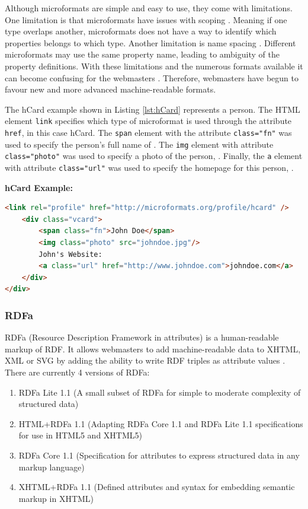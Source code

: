 Although microformats are simple and easy to use, they come with limitations. One limitation is that microformats have issues with scoping \cite{microformatsIssues}. Meaning if one type overlaps another, microformats does not have a way to identify which properties belongs to which type. Another limitation is name spacing \cite{microformatsIssues}. Different microformats may use the same property name, leading to ambiguity of the property definitions. With these limitations and the numerous formats available it can become confusing for the webmasters \cite{schemaOrg}. Therefore, webmasters have begun to favour new and more advanced machine-readable formats. 

The hCard example shown in Listing \ref{lst:hCard} represents a person. The HTML element \texttt{link} specifies which type of microformat is used through the attribute \texttt{href}, in this case hCard. The \texttt{span} element with the attribute \texttt{class="fn"} was used to specify the person's full name of . The \texttt{img} element with attribute \texttt{class="photo"} was used to specify a photo of the person, . Finally, the \texttt{a} element with attribute \texttt{class="url"} was used to specify the homepage for this person,  \cite{hcardMicroformat}.\newline

\noindent
\textbf{hCard Example:}
{
\begin{lstlisting}[language=HTML,caption={A hCard example},captionpos=b,label={lst:hCard}]
<link rel="profile" href="http://microformats.org/profile/hcard" />
    <div class="vcard">
        <span class="fn">John Doe</span>
        <img class="photo" src="johndoe.jpg"/>
        John's Website: 
        <a class="url" href="http://www.johndoe.com">johndoe.com</a>
    </div>
</div>
\end{lstlisting}
}

\subsubsection{RDFa}
RDFa (Resource Description Framework in attributes) is a human-readable markup of RDF. It allows webmasters to add machine-readable data to XHTML, XML or SVG by adding the ability to write RDF triples as attribute values \cite{sikos2015mastering}. There are currently 4 versions of RDFa: 

{
\begin{enumerate}
    \item RDFa Lite 1.1 (A small subset of RDFa for simple to moderate complexity of structured data) \cite{sporny2015rdfa}
    \item HTML+RDFa 1.1 (Adapting RDFa Core 1.1 and RDFa Lite 1.1 specifications for use in HTML5 and XHTML5) \cite{mccarron2013html+}
    \item RDFa Core 1.1 (Specification for attributes to express structured data in any markup language) \cite{adida2007rdfa}
    \item XHTML+RDFa 1.1  (Defined attributes and syntax for embedding semantic markup in XHTML)
    \cite{adida2008rdfa}
\end{enumerate}
}

